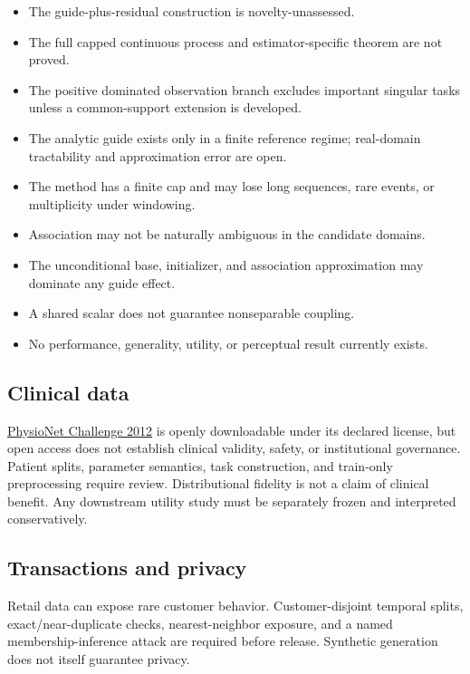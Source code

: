 \documentclass[11pt]{article}
\begin{document}
\begin{itemize}
\item The guide-plus-residual construction is novelty-unassessed.
\item The full capped continuous process and estimator-specific theorem are not proved.
\item The positive dominated observation branch excludes important singular tasks unless a common-support extension is developed.
\item The analytic guide exists only in a finite reference regime; real-domain tractability and approximation error are open.
\item The method has a finite cap and may lose long sequences, rare events, or multiplicity under windowing.
\item Association may not be naturally ambiguous in the candidate domains.
\item The unconditional base, initializer, and association approximation may dominate any guide effect.
\item A shared scalar does not guarantee nonseparable coupling.
\item No performance, generality, utility, or perceptual result currently exists.
\end{itemize}

\subsection{Clinical data}
\label{sec:clinical-data}

\href{https://physionet.org/content/challenge-2012/1.0.0/}{PhysioNet Challenge 2012} is openly downloadable under its declared license, but open access does not establish clinical validity, safety, or institutional governance. Patient splits, parameter semantics, task construction, and train-only preprocessing require review. Distributional fidelity is not a claim of clinical benefit. Any downstream utility study must be separately frozen and interpreted conservatively.

\subsection{Transactions and privacy}
\label{sec:transactions-and-privacy}

Retail data can expose rare customer behavior. Customer-disjoint temporal splits, exact/\allowbreak{}near-duplicate checks, nearest-neighbor exposure, and a named membership-inference attack are required before release. Synthetic generation does not itself guarantee privacy.
\end{document}
